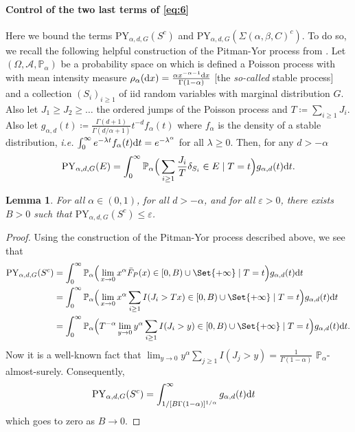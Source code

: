 \documentclass{article}
\newtheorem{lemma}{Lemma}
\newcommand{\1}{\boldsymbol{1}}
\newcommand{\PP}{\mathbb{P}}
\theoremstyle{plain}
\begin{document}
\paragraph{Control of the two last terms of \eqref{eq:6}}

Here we bound the terms $\mathrm{PY}_{\alpha,d,G}(S^c)$ and $\mathrm{PY}_{\alpha,d,G}(\Sigma(\alpha,\beta,C)^c)$. To do so, we recall the following helpful construction of the Pitman-Yor process from \cite[Example~14.47]{Gho(17)}. Let $(\Omega,\mathcal{A},\PP_{\alpha})$ be a probability space on which is defined a Poisson process with with mean intensity measure $\rho_{\alpha}(\mathrm{d} x) = \frac{\alpha x^{-\alpha-1}\mathrm{d} x}{\Gamma(1-\alpha)}$ [the \textit{so-called} stable process] and a collection $(S_i)_{i\geq 1}$ of iid random variables with marginal distribution $G$. Also let $J_1 \geq J_2 \geq \dots$
the ordered jumps of the Poisson process and $T \coloneqq \sum_{i\geq 1}J_i$. Also let $g_{\alpha,d}(t) \coloneqq \frac{\Gamma(d+1)}{\Gamma(d/\alpha+1)}t^{-d}f_{\alpha}(t)$ where $f_{\alpha}$ is the density of a stable distribution, \textit{i.e.} $\int_0^{\infty}e^{-\lambda t} f_{\alpha}(t)\mathrm{d} t = e^{-\lambda^{\alpha}}$ for all $\lambda \geq 0$. Then, for any $d > -\alpha$
\begin{equation*}
  \mathrm{PY}_{\alpha,d,G}(E)%
  = \int_0^{\infty}\PP_{\alpha}\Big( \sum_{i\geq 1}\frac{J_i}{T}\delta_{S_i} \in E \mid T = t \Big)g_{\alpha,d}(t)\intd t.
\end{equation*}

\begin{lemma}
  \label{lem:1a}
  For all $\alpha \in (0,1)$, for all $d > -\alpha$, and for all $\varepsilon > 0$, there exists $B > 0$ such that $\mathrm{PY}_{\alpha,d,G}(S^c) \leq \varepsilon$.
\end{lemma}
\begin{proof}
  Using the construction of the Pitman-Yor process described above, we see that
  \begin{align*}
    \mathrm{PY}_{\alpha,d,G}(S^c)%
    &= \int_0^{\infty}\PP_{\alpha}\Big(\lim_{x\to 0}x^{\alpha}\bar{F}_P(x) \in [0,B)\cup \Set{+\infty} \mid T = t \Big)g_{\alpha,d}(t)\intd t\\
    &= \int_0^{\infty}\PP_{\alpha}\Big(\lim_{x\to 0}x^{\alpha}\sum_{i\geq 1}I(J_i > T x)  \in [0,B)\cup \Set{+\infty} \mid T = t \Big)g_{\alpha,d}(t)\intd t\\
    &= \int_0^{\infty}\PP_{\alpha}\Big(T^{-\alpha}\lim_{y\to 0}y^{\alpha}\sum_{i\geq 1}I(J_i > y)\in [0,B)\cup \Set{+\infty} \mid T = t \Big)g_{\alpha,d}(t)\intd t.
  \end{align*}
  Now it is a well-known fact that $\lim_{y\to 0}y^{\alpha} \sum_{j\geq 1}I(J_j > y) = \frac{1}{\Gamma(1-\alpha)}$ $\PP_{\alpha}$-almost-surely. Consequently,
  \begin{align*}
    \mathrm{PY}_{\alpha,d,G}(S^c)%
    &= \int_{1/[B\Gamma(1-\alpha)]^{1/\alpha}}^{\infty}g_{\alpha,d}(t)\intd t
  \end{align*}
  which goes to zero as $B \to 0$.
\end{proof}
\end{document}
